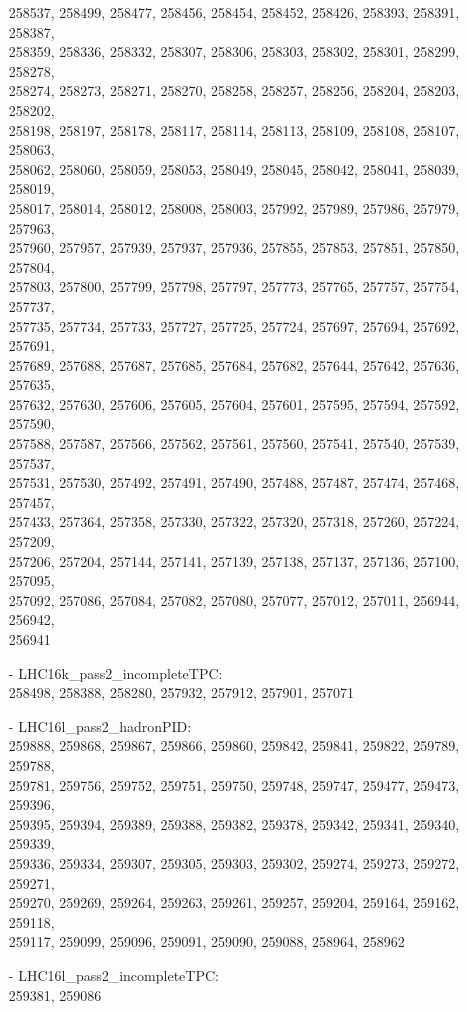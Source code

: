 \begin{appendix}
\begin{itemize}
     258537, 258499, 258477, 258456, 258454, 258452, 258426, 258393, 258391, 258387,\\
     258359, 258336, 258332, 258307, 258306, 258303, 258302, 258301, 258299, 258278,\\
     258274, 258273, 258271, 258270, 258258, 258257, 258256, 258204, 258203, 258202,\\
     258198, 258197, 258178, 258117, 258114, 258113, 258109, 258108, 258107, 258063,\\
     258062, 258060, 258059, 258053, 258049, 258045, 258042, 258041, 258039, 258019,\\
     258017, 258014, 258012, 258008, 258003, 257992, 257989, 257986, 257979, 257963,\\
     257960, 257957, 257939, 257937, 257936, 257855, 257853, 257851, 257850, 257804,\\
     257803, 257800, 257799, 257798, 257797, 257773, 257765, 257757, 257754, 257737,\\
     257735, 257734, 257733, 257727, 257725, 257724, 257697, 257694, 257692, 257691,\\
     257689, 257688, 257687, 257685, 257684, 257682, 257644, 257642, 257636, 257635,\\
     257632, 257630, 257606, 257605, 257604, 257601, 257595, 257594, 257592, 257590,\\
     257588, 257587, 257566, 257562, 257561, 257560, 257541, 257540, 257539, 257537,\\
     257531, 257530, 257492, 257491, 257490, 257488, 257487, 257474, 257468, 257457,\\
     257433, 257364, 257358, 257330, 257322, 257320, 257318, 257260, 257224, 257209,\\
     257206, 257204, 257144, 257141, 257139, 257138, 257137, 257136, 257100, 257095,\\
     257092, 257086, 257084, 257082, 257080, 257077, 257012, 257011, 256944, 256942,\\
     256941
    \item[-] LHC16k\_pass2\_incompleteTPC:\\[1pt]
     258498, 258388, 258280, 257932, 257912, 257901, 257071
    \item[-] LHC16l\_pass2\_hadronPID:\\[1pt]
     259888, 259868, 259867, 259866, 259860, 259842, 259841, 259822, 259789, 259788,\\
     259781, 259756, 259752, 259751, 259750, 259748, 259747, 259477, 259473, 259396,\\
     259395, 259394, 259389, 259388, 259382, 259378, 259342, 259341, 259340, 259339,\\
     259336, 259334, 259307, 259305, 259303, 259302, 259274, 259273, 259272, 259271,\\
     259270, 259269, 259264, 259263, 259261, 259257, 259204, 259164, 259162, 259118,\\
     259117, 259099, 259096, 259091, 259090, 259088, 258964, 258962
    \item[-] LHC16l\_pass2\_incompleteTPC:\\[1pt]
     259381, 259086 
\end{itemize}


\end{appendix}
